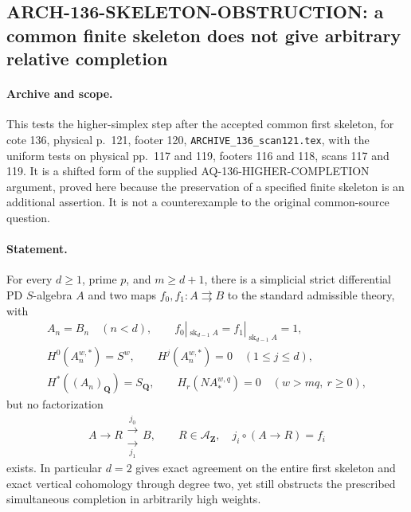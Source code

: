 \subsection{ARCH-136-SKELETON-OBSTRUCTION: a common finite skeleton does not give arbitrary relative completion}

\paragraph{Archive and scope.}
This tests the higher-simplex step after the accepted common first
skeleton, for cote 136, physical p.~121, footer 120,
\texttt{ARCHIVE\_136\_scan121.tex}, with the uniform tests on
physical pp.~117 and 119, footers 116 and 118, scans 117 and 119.
It is a shifted form of the supplied AQ-136-HIGHER-COMPLETION
argument, proved here because the preservation of a specified
finite skeleton is an additional assertion.  It is not a
counterexample to the original common-source question.

\paragraph{Statement.}
For every $d\geq1$, prime $p$, and $m\geq d+1$, there is a
simplicial strict differential PD $S$-algebra $A$ and two maps
$f_0,f_1:A\rightrightarrows B$ to the standard admissible theory,
with
\[
 \begin{gathered}
 A_n=B_n\quad(n<d),\qquad
 f_0|_{\operatorname{sk}_{d-1}A}
     =f_1|_{\operatorname{sk}_{d-1}A}=1,\\
 H^0(A_n^{w,*})=S^w,\qquad
 H^j(A_n^{w,*})=0\quad(1\leq j\leq d),\\
 H^*((A_n)_{\mathbf Q})=S_{\mathbf Q},\qquad
 H_r(NA_*^{w,q})=0\quad(w>mq,\ r\geq0),
 \end{gathered}                                           \tag{136.SO1}
\]
but no factorization
\[
       A\longrightarrow R
          \mathrel{\substack{\xrightarrow{j_0}\\[-3pt]
                            \xrightarrow[j_1]{}}}B,
       \qquad R\in\mathcal A_{\mathbf Z},\quad
                    j_i\circ(A\to R)=f_i               \tag{136.SO2}
\]
exists.  In particular $d=2$ gives exact agreement on the entire
first skeleton and exact vertical cohomology through degree two,
yet still obstructs the prescribed simultaneous completion in
arbitrarily high weights.

